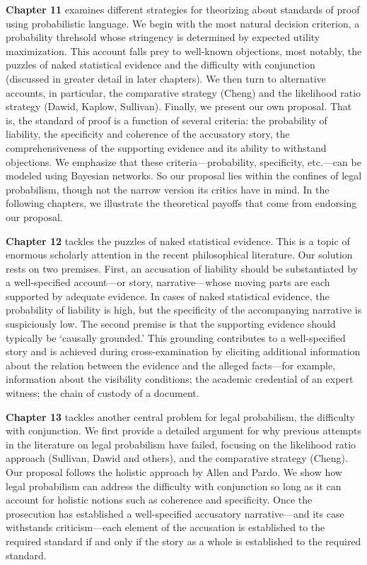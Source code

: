 \documentclass[
  10pt,
  dvipsnames,enabledeprecatedfontcommands]{scrartcl}
\begin{document}
\textbf{Chapter 11} examines different strategies for theorizing about
standards of proof using probabilistic language. We begin with the most
natural decision criterion, a probability threhsold whose stringency is
determined by expected utility maximization. This account falls prey to
well-known objections, most notably, the puzzles of naked statistical
evidence and the difficulty with conjunction (discussed in greater
detail in later chapters). We then turn to alternative accounts, in
particular, the comparative strategy (Cheng) and the likelihood ratio
strategy (Dawid, Kaplow, Sullivan). Finally, we present our own
proposal. That is, the standard of proof is a function of several
criteria: the probability of liability, the specificity and coherence of
the accusatory story, the comprehensiveness of the supporting evidence
and its ability to withstand objections. We emphasize that these
criteria---probability, specificity, etc.---can be modeled using
Bayesian networks. So our proposal lies within the confines of legal
probabilism, though not the narrow version its critics have in mind. In
the following chapters, we illustrate the theoretical payoffs that come
from endorsing our proposal.

\textbf{Chapter 12} tackles the puzzles of naked statistical evidence.
This is a topic of enormous scholarly attention in the recent
philosophical literature. Our solution rests on two premises. First, an
accusation of liability should be substantiated by a well-specified
account---or story, narrative---whose moving parts are each supported by
adequate evidence. In cases of naked statistical evidence, the
probability of liability is high, but the specificity of the
accompanying narrative is suspiciously low. The second premise is that
the supporting evidence should typically be `causally grounded.' This
grounding contributes to a well-specified story and is achieved during
cross-examination by eliciting additional information about the relation
between the evidence and the alleged facts---for example, information
about the visibility conditions; the academic credential of an expert
witness; the chain of custody of a document.

\textbf{Chapter 13} tackles another central problem for legal
probabilism, the difficulty with conjunction. We first provide a
detailed argument for why previous attempts in the literature on legal
probabilism have failed, focusing on the likelihood ratio approach
(Sullivan, Dawid and others), and the comparative strategy (Cheng). Our
proposal follows the holistic approach by Allen and Pardo. We show how
legal probabilism can address the difficulty with conjunction so long as
it can account for holistic notions such as coherence and specificity.
Once the prosecution has established a well-specified accusatory
narrative---and its case withstands criticism---each element of the
accusation is established to the required standard if and only if the
story as a whole is established to the required standard.
\end{document}
